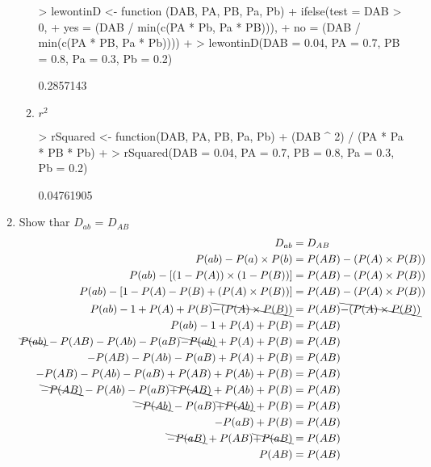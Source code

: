 \documentclass[12pt,a4paper]{paper}
\begin{document}
\begin{enumerate}
\begin{enumerate}
\begin{Schunk}
\begin{Sinput}
> lewontinD <- function (DAB, PA, PB, Pa, Pb) {
+   ifelse(test = DAB > 0,
+          yes = (DAB / min(c(PA * Pb, Pa * PB))),
+          no = (DAB / min(c(PA * PB, Pa * Pb))))
+ }
> lewontinD(DAB = 0.04, PA = 0.7, PB = 0.8, Pa = 0.3, Pb = 0.2)
\end{Sinput}
\begin{Soutput}
[1] 0.2857143
\end{Soutput}
\end{Schunk}
\item $r^{2}$
\begin{Schunk}
\begin{Sinput}
> rSquared <- function(DAB, PA, PB, Pa, Pb) {
+   (DAB ^ 2) / (PA * Pa * PB * Pb)
+ }
> rSquared(DAB = 0.04, PA = 0.7, PB = 0.8, Pa = 0.3, Pb = 0.2)
\end{Sinput}
\begin{Soutput}
[1] 0.04761905
\end{Soutput}
\end{Schunk}
\end{enumerate}
\item Show thar $D_{ab}$ = $D_{AB}$
\begin{equation}
\begin{split}
D_{ab} &= D_{AB}\\
P(ab) - P(a) \times P(b) &= P(AB) - (P(A) \times P(B))\\
P(ab) - \left[(1-P(A)) \times (1-P(B))\right] &= P(AB) - (P(A) \times P(B))\\
P(ab) - \left[1 - P(A) -P(B) + (P(A) \times P(B))\right] &= P(AB) - (P(A) \times P(B))\\
P(ab) - 1 + P(A) + P(B) \bcancel{- (P(A) \times P(B))} &= P(AB) \bcancel{- (P(A) \times P(B))}\\
P(ab) - 1 + P(A) + P(B)  &= P(AB)\\
\bcancel{P(ab)} - P(AB) - P(Ab) - P(aB) \bcancel{- P(ab)} + P(A) + P(B)  &= P(AB)\\
- P(AB) - P(Ab) - P(aB) + P(A) + P(B)  &= P(AB)\\
- P(AB) - P(Ab) - P(aB) + P(AB) + P(Ab) + P(B)  &= P(AB)\\
\bcancel{- P(AB)} - P(Ab) - P(aB) \bcancel{+ P(AB)} + P(Ab) + P(B)  &= P(AB)\\
\bcancel{- P(Ab)} - P(aB) \bcancel{+ P(Ab)} + P(B)  &= P(AB)\\
- P(aB) + P(B)  &= P(AB)\\
\bcancel{- P(aB)} + P(AB) \bcancel{+ P(aB)} &= P(AB)\\
P(AB) &= P(AB)\\
\end{split}
\end{equation}
\end{enumerate}
\end{document}
